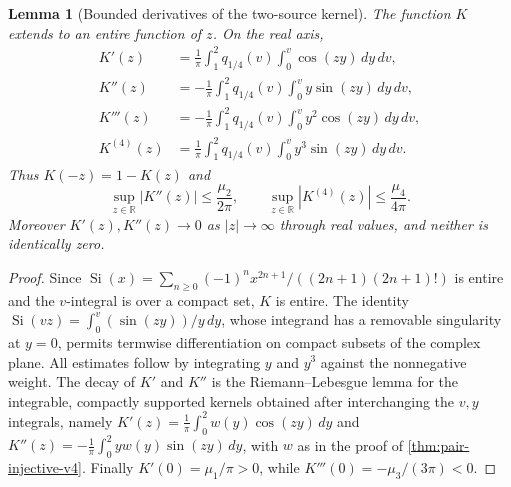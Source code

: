 \documentclass[11pt,a4paper]{article}
\numberwithin{equation}{section}
\newtheorem{lemma}[theorem]{Lemma}
\theoremstyle{definition}
\theoremstyle{remark}
\begin{document}
\begin{lemma}[Bounded derivatives of the two-source kernel]
\label{lem:Kder-v4}
The function $K$ extends to an entire function of $z$. On the real
axis,
\begin{equation}\label{eq:Kder-v4}
\begin{split}
 K'(z)&=\frac1\pi\int_1^2q_{1/4}(v)\int_0^v\cos(zy)\,dy\,dv,\\
 K''(z)&=-\frac1\pi\int_1^2q_{1/4}(v)\int_0^v y\sin(zy)\,dy\,dv,\\
 K'''(z)&=-\frac1\pi\int_1^2q_{1/4}(v)\int_0^v y^2\cos(zy)\,dy\,dv,\\
 K^{(4)}(z)&=\frac1\pi\int_1^2q_{1/4}(v)
 \int_0^v y^3\sin(zy)\,dy\,dv.
\end{split}
\end{equation}
Thus $K(-z)=1-K(z)$ and
\begin{equation}\label{eq:Kbounded-v4}
 \sup_{z\in\mathbb R}|K''(z)|\le\frac{\mu_2}{2\pi},\qquad
 \sup_{z\in\mathbb R}|K^{(4)}(z)|\le\frac{\mu_4}{4\pi}.
\end{equation}
Moreover $K'(z),K''(z)\to0$ as $|z|\to\infty$ through real values,
and neither is identically zero.
\end{lemma}
\begin{proof}
Since $\operatorname{Si}(x)=\sum_{n\ge0}(-1)^nx^{2n+1}/((2n+1)(2n+1)!)$
is entire and the $v$-integral is over a compact set, $K$ is entire.
The identity
$\operatorname{Si}(vz)=\int_0^v(\sin(zy))/y\,dy$, whose integrand has a
removable singularity at $y=0$, permits
termwise differentiation on compact subsets of the complex plane.
All estimates follow by integrating $y$ and $y^3$ against the
nonnegative weight. The decay of $K'$ and $K''$ is the
Riemann--Lebesgue lemma for the integrable, compactly supported
kernels obtained after interchanging the $v,y$ integrals, namely
$K'(z)=\frac1\pi\int_0^2w(y)\cos(zy)\,dy$ and
$K''(z)=-\frac1\pi\int_0^2yw(y)\sin(zy)\,dy$, with $w$ as in the proof
of \cref{thm:pair-injective-v4}. Finally
$K'(0)=\mu_1/\pi>0$, while
$K'''(0)=-\mu_3/(3\pi)<0$.
\end{proof}
\end{document}
